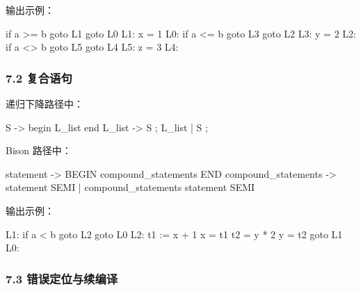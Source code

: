 \documentclass[
  a4paper,
  fontset=none,
]{ctexart}
\newenvironment{Shaded}{}{}
\newcommand{\NormalTok}[1]{#1}
\begin{document}
输出示例：

\begin{Shaded}
\begin{Highlighting}[]
\NormalTok{if a \textgreater{}= b goto L1}
\NormalTok{goto L0}
\NormalTok{L1: x = 1}
\NormalTok{L0: if a \textless{}= b goto L3}
\NormalTok{goto L2}
\NormalTok{L3: y = 2}
\NormalTok{L2: if a \textless{}\textgreater{} b goto L5}
\NormalTok{goto L4}
\NormalTok{L5: z = 3}
\NormalTok{L4:}
\end{Highlighting}
\end{Shaded}

\hypertarget{ux590dux5408ux8bedux53e5}{%
\subsubsection{7.2 复合语句}\label{ux590dux5408ux8bedux53e5}}

递归下降路径中：

\begin{Shaded}
\begin{Highlighting}[]
\NormalTok{S {-}\textgreater{} begin L\_list end}
\NormalTok{L\_list {-}\textgreater{} S ; L\_list | S ;}
\end{Highlighting}
\end{Shaded}

Bison 路径中：

\begin{Shaded}
\begin{Highlighting}[]
\NormalTok{statement {-}\textgreater{} BEGIN compound\_statements END}
\NormalTok{compound\_statements {-}\textgreater{} statement SEMI}
\NormalTok{                    | compound\_statements statement SEMI}
\end{Highlighting}
\end{Shaded}

输出示例：

\begin{Shaded}
\begin{Highlighting}[]
\NormalTok{L1: if a \textless{} b goto L2}
\NormalTok{goto L0}
\NormalTok{L2: t1 := x + 1}
\NormalTok{x = t1}
\NormalTok{t2 = y * 2}
\NormalTok{y = t2}
\NormalTok{goto L1}
\NormalTok{L0:}
\end{Highlighting}
\end{Shaded}

\hypertarget{ux9519ux8befux5b9aux4f4dux4e0eux7eedux7f16ux8bd1}{%
\subsubsection{7.3
错误定位与续编译}\label{ux9519ux8befux5b9aux4f4dux4e0eux7eedux7f16ux8bd1}}
\end{document}
